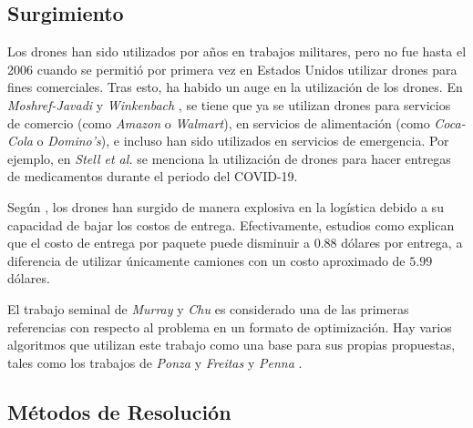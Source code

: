 
\subsection{Surgimiento}

Los drones han sido utilizados por años en trabajos militares, pero no fue hasta el 2006 cuando se permitió por primera vez en Estados Unidos utilizar drones para fines comerciales. Tras esto, ha habido un auge en la utilización de los drones. En \textit{Moshref-Javadi} y \textit{Winkenbach} \cite{moshrefjavadi2021applications}, se tiene que ya se utilizan drones para servicios de comercio (como \textit{Amazon} o \textit{Walmart}), en servicios de alimentación (como \textit{Coca-Cola} o \textit{Domino's}), e incluso han sido utilizados en servicios de emergencia. Por ejemplo, en \textit{Stell et al.} \cite{stell2022drone} se menciona la utilización de drones para hacer entregas de medicamentos durante el periodo del COVID-19.

Según \cite{transinfo_drones}, los drones han surgido de manera explosiva en la logística debido a su capacidad de bajar los costos de entrega. Efectivamente, estudios como \cite{moshrefjavadi2021applications} explican que el costo de entrega por paquete puede disminuir a $0.88$ dólares por entrega, a diferencia de utilizar únicamente camiones con un costo aproximado de $5.99$ dólares.

El trabajo seminal de \textit{Murray} y \textit{Chu} \cite{Murray2015Flying} es considerado una de las primeras referencias con respecto al problema en un formato de optimización. Hay varios algoritmos que utilizan este trabajo como una base para sus propias propuestas, tales como los trabajos de \textit{Ponza} \cite{ponza2016optimization} y \textit{Freitas} y \textit{Penna} \cite{freitas2021exact}.

\subsection{Métodos de Resolución}


